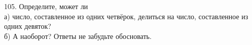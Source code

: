 105. Определите, может ли\\
а) число, составленное из одних четвёрок, делиться на число, составленное из одних девяток?\\
б) А наоборот? Ответы не забудьте обосновать.\\
